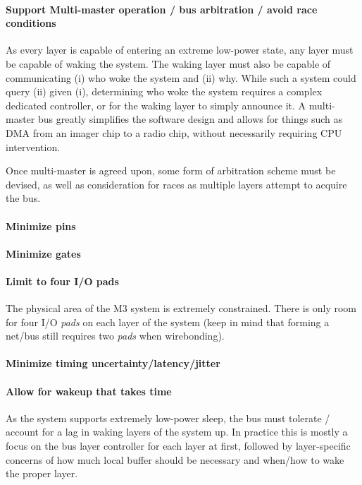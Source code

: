 \paragraph{Support Multi-master operation / bus arbitration / avoid race
conditions}
As every layer is capable of entering an extreme low-power state, any layer
must be capable of waking the system. The waking layer must also be capable of
communicating (i) who woke the system and (ii) why. While such a system could
query (ii) given (i), determining who woke the system requires a complex
dedicated controller, or for the waking layer to simply announce it. A
multi-master bus greatly simplifies the software design and allows for things
such as DMA from an imager chip to a radio chip, without necessarily requiring
CPU intervention.

Once multi-master is agreed upon, some form of arbitration scheme must be
devised, as well as consideration for races as multiple layers attempt to
acquire the bus.

\paragraph{Minimize pins}
\paragraph{Minimize gates}
\paragraph{Limit to four I/O pads}
The physical area of the M3 system is extremely constrained. There is only
room for four I/O {\em pads} on each layer of the system (keep in mind that
forming a net/bus still requires two {\em pads} when wirebonding).

\paragraph{Minimize timing uncertainty/latency/jitter}

\paragraph{Allow for wakeup that takes time}
As the system supports extremely low-power sleep, the bus must tolerate /
account for a lag in waking layers of the system up. In practice this is
mostly a focus on the bus layer controller for each layer at first, followed
by layer-specific concerns of how much local buffer should be necessary and
when/how to wake the proper layer.

